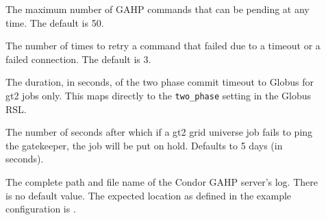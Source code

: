 \begin{description}
\item[]
\label{param:GridmanagerMaxPendingRequests} The maximum number of GAHP
commands that can be pending at any time. The default is 50.

\item[]
\label{param:GridmanagerConnectFailureRetryCount} The number of times
to retry a command that failed due to a timeout or a failed connection.
The default is 3.

\item[]
\label{param:GridmanagerGlobusCommitTimeout}  The duration, in seconds, of the
two phase commit timeout to Globus for gt2 jobs only.  This maps directly to the \texttt{two\_phase} setting in the Globus RSL.



\item[]
\label{param:GlobusGatekeeperTimeout} The number of seconds after
which if a gt2 grid
universe job fails to ping the gatekeeper,
the job will be put on hold.
Defaults to 5 days (in seconds).

\item[]
\label{param:CGAHPLog} The complete path and file name of the
Condor GAHP server's log.
There is no default value. The expected location as defined
in the example configuration is .


\end{description}
